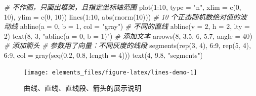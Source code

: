 \documentclass[
  b5paper,
  UTF8,twoside]{book}
\newenvironment{Shaded}{\begin{snugshade}}{\end{snugshade}}
\newcommand{\AttributeTok}[1]{\textcolor[rgb]{0.77,0.63,0.00}{#1}}
\newcommand{\CommentTok}[1]{\textcolor[rgb]{0.56,0.35,0.01}{\textit{#1}}}
\newcommand{\DecValTok}[1]{\textcolor[rgb]{0.00,0.00,0.81}{#1}}
\newcommand{\FloatTok}[1]{\textcolor[rgb]{0.00,0.00,0.81}{#1}}
\newcommand{\FunctionTok}[1]{\textcolor[rgb]{0.00,0.00,0.00}{#1}}
\newcommand{\NormalTok}[1]{#1}
\newcommand{\SpecialCharTok}[1]{\textcolor[rgb]{0.00,0.00,0.00}{#1}}
\newcommand{\StringTok}[1]{\textcolor[rgb]{0.31,0.60,0.02}{#1}}
\begin{document}
\begin{Shaded}
\begin{Highlighting}[]
\CommentTok{\# 不作图，只画出框架，且指定坐标轴范围}
\FunctionTok{plot}\NormalTok{(}\DecValTok{1}\SpecialCharTok{:}\DecValTok{10}\NormalTok{, }\AttributeTok{type =} \StringTok{"n"}\NormalTok{, }\AttributeTok{xlim =} \FunctionTok{c}\NormalTok{(}\DecValTok{0}\NormalTok{, }\DecValTok{10}\NormalTok{), }\AttributeTok{ylim =} \FunctionTok{c}\NormalTok{(}\DecValTok{0}\NormalTok{, }\DecValTok{10}\NormalTok{))}
\FunctionTok{lines}\NormalTok{(}\DecValTok{1}\SpecialCharTok{:}\DecValTok{10}\NormalTok{, }\FunctionTok{abs}\NormalTok{(}\FunctionTok{rnorm}\NormalTok{(}\DecValTok{10}\NormalTok{))) }\CommentTok{\# 10 个正态随机数绝对值的波动线}
\FunctionTok{abline}\NormalTok{(}\AttributeTok{a =} \DecValTok{0}\NormalTok{, }\AttributeTok{b =} \DecValTok{1}\NormalTok{, }\AttributeTok{col =} \StringTok{"gray"}\NormalTok{) }\CommentTok{\# 不同的直线}
\FunctionTok{abline}\NormalTok{(}\AttributeTok{v =} \DecValTok{2}\NormalTok{, }\AttributeTok{h =} \DecValTok{2}\NormalTok{, }\AttributeTok{lty =} \DecValTok{2}\NormalTok{)}
\FunctionTok{text}\NormalTok{(}\DecValTok{8}\NormalTok{, }\DecValTok{3}\NormalTok{, }\StringTok{"abline(a = 0, b = 1)"}\NormalTok{) }\CommentTok{\# 添加文本}
\FunctionTok{arrows}\NormalTok{(}\DecValTok{8}\NormalTok{, }\FloatTok{3.5}\NormalTok{, }\DecValTok{6}\NormalTok{, }\FloatTok{5.7}\NormalTok{, }\AttributeTok{angle =} \DecValTok{40}\NormalTok{) }\CommentTok{\# 添加箭头}
\CommentTok{\# 参数用了向量：不同灰度的线段}
\FunctionTok{segments}\NormalTok{(}\FunctionTok{rep}\NormalTok{(}\DecValTok{3}\NormalTok{, }\DecValTok{4}\NormalTok{), }\DecValTok{6}\SpecialCharTok{:}\DecValTok{9}\NormalTok{, }\FunctionTok{rep}\NormalTok{(}\DecValTok{5}\NormalTok{, }\DecValTok{4}\NormalTok{), }\DecValTok{6}\SpecialCharTok{:}\DecValTok{9}\NormalTok{, }\AttributeTok{col =} \FunctionTok{gray}\NormalTok{(}\FunctionTok{seq}\NormalTok{(}\FloatTok{0.2}\NormalTok{, }\FloatTok{0.8}\NormalTok{, }\AttributeTok{length =} \DecValTok{4}\NormalTok{)))}
\FunctionTok{text}\NormalTok{(}\DecValTok{4}\NormalTok{, }\FloatTok{9.8}\NormalTok{, }\StringTok{"segments"}\NormalTok{)}
\end{Highlighting}
\end{Shaded}

\begin{figure}

{\centering \texttt{[image: elements\_files/figure-latex/lines-demo-1]} 

}

\caption{ 曲线、直线、直线段、箭头的展示说明 }\label{fig:lines-demo}
\end{figure}
\end{document}
